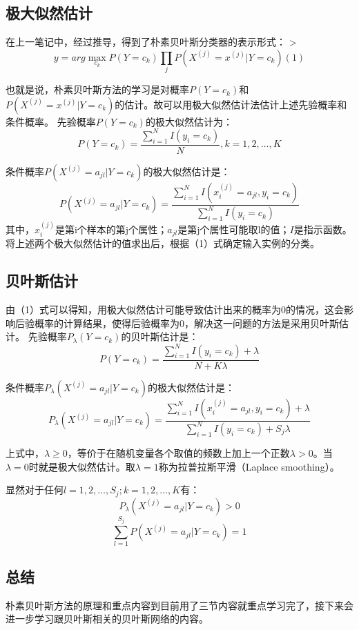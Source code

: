 \documentclass[a4paper,12pt]{book}
\begin{document}
    \subsection{极大似然估计}

    在上一笔记中，经过推导，得到了朴素贝叶斯分类器的表示形式：
    > $$ y = arg \max_{c_k} P(Y=c_k)\prod_jP(X^{(j)} =  x^{(j)}| Y=c_k)  (1)$$

    也就是说，朴素贝叶斯方法的学习是对概率$P(Y=c_k)$和$P(X^{(j)} =  x^{(j)}| Y=c_k) $的估计。故可以用极大似然估计法估计上述先验概率和条件概率。
    先验概率$P(Y=c_k)$的极大似然估计为：
    $$P(Y=c_k) = \frac{\sum_{i=1}^{N}I(y_i=c_k)}{N}, k=1,2, \dots, K$$

    条件概率$P(X^{(j)} =  a_{jl}| Y=c_k) $的极大似然估计是：
    $$P(X^{(j)} =  a_{jl}| Y=c_k) = \frac{\sum_{i=1}^{N}I(x_i^{(j)} =  a_{jl},y_i=c_k)}{\sum_{i=1}^{N}I(y_i=c_k)}$$
    其中，$x_i^{(j)}$是第i个样本的第j个属性；$a_{jl}$是第j个属性可能取l的值；$I$是指示函数。
    将上述两个极大似然估计的值求出后，根据（1）式确定输入实例的分类。
    \subsection{贝叶斯估计}

    由（1）式可以得知，用极大似然估计可能导致估计出来的概率为0的情况，这会影响后验概率的计算结果，使得后验概率为0，解决这一问题的方法是采用贝叶斯估计。
    先验概率$P_{\lambda}(Y=c_k)$的贝叶斯估计是：
    $$
    P(Y=c_k) = \frac{\sum_{i=1}^{N}I(y_i=c_k)+\lambda}{N+K\lambda}
    $$

    条件概率$P_{\lambda}(X^{(j)} =  a_{jl}| Y=c_k) $的极大似然估计是：
    $$P_{\lambda}(X^{(j)} =  a_{jl}| Y=c_k) = \frac{\sum_{i=1}^{N}I(x_i^{(j)} =  a_{jl},y_i=c_k)+\lambda}{\sum_{i=1}^{N}I(y_i=c_k)+S_j\lambda}$$

    上式中，$\lambda \ge 0$，等价于在随机变量各个取值的频数上加上一个正数$\lambda > 0$。当$\lambda = 0$时就是极大似然估计。取$\lambda = 1$称为拉普拉斯平滑（Laplace smoothing）。

    显然对于任何$l =1,2, \dots,S_j; k=1,2 ,\dots,K$有：
    $$
    P_{\lambda}(X^{(j)} =  a_{jl}| Y=c_k) >0
    $$
    $$
    \sum_{l=1}^{S_j}P(X^{(j)} =  a_{jl}| Y=c_k) =1
    $$

    \subsection{总结}

    朴素贝叶斯方法的原理和重点内容到目前用了三节内容就重点学习完了，接下来会进一步学习跟贝叶斯相关的贝叶斯网络的内容。
    
\end{document}
